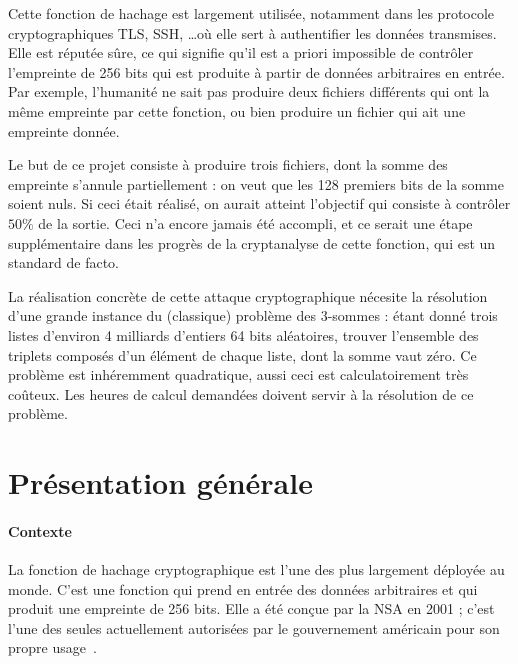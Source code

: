 \documentclass[
    a4paper, 
    12pt, onecolumn,
]{article}
\begin{document}
Cette fonction de hachage \sha est largement utilisée, notamment dans les
protocole cryptographiques \textsf{TLS}, \textsf{SSH}, \ldots où elle sert à
authentifier les données transmises. Elle est réputée sûre, ce qui signifie
qu'il est a priori impossible de \og contrôler\fg{} l'empreinte de 256 bits qui
est produite à partir de données arbitraires en entrée. Par exemple, l'humanité
ne sait pas produire deux fichiers différents qui ont la même empreinte par
cette fonction, ou bien produire un fichier qui ait une empreinte donnée.

Le but de ce projet consiste à produire trois fichiers, dont la somme des
empreinte s'annule partiellement : on veut que les 128 premiers bits de la somme
soient nuls. Si ceci était réalisé, on aurait atteint l'objectif qui consiste à
\og contrôler\fg{} $50\%$ de la sortie. Ceci n'a encore jamais été accompli, et
ce serait une étape supplémentaire dans les progrès de la cryptanalyse de cette
fonction, qui est un standard de facto.

La réalisation concrète de cette \og attaque cryptographique\fg{} nécesite la
résolution d'une grande instance du (classique) problème des 3-sommes : étant
donné trois listes d'environ 4 milliards d'entiers 64 bits aléatoires, trouver
l'ensemble des triplets composés d'un élément de chaque liste, dont la somme
vaut zéro. Ce problème est inhéremment quadratique, aussi ceci est
calculatoirement très coûteux. Les heures de calcul demandées doivent servir à
la résolution de ce problème.



\newpage\section{Pr\'esentation g\'en\'erale}


\paragraph{Contexte} La fonction de hachage cryptographique \sha est l'une des
plus largement déployée au monde. C'est une fonction qui prend en entrée des
données arbitraires et qui produit une empreinte de 256 bits. Elle a été conçue
par la NSA en 2001 ; c'est l'une des seules actuellement autorisées par le
gouvernement américain pour son propre usage~\cite{NIST}.
\end{document}
